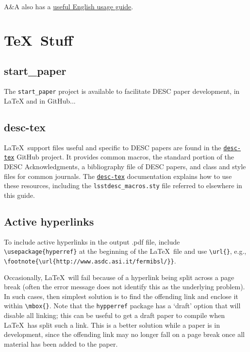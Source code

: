 \documentclass[letterpaper,11pt]{article}
\begin{document}
A\&A also has a \href{http://www.aanda.org/doc_journal/instructions/aa_english_guide.pdf}{useful English usage guide}. 

\section{\TeX\ Stuff}

\subsection{start\_paper}

The {\tt start\_paper} project is available to facilitate DESC paper development, in LaTeX and in GitHub...

\subsection{desc-tex}

La\TeX\ support files useful and specific to DESC papers are found in
the \href{https://github.com/LSSTDESC/desc-tex}{\tt desc-tex} GitHub project.
It provides common macros, the standard portion of the DESC Acknowledgments, a bibliography file of DESC papers, and class and style files for common journals.
The \href{https://github.com/LSSTDESC/desc-tex}{\tt desc-tex} documentation explains how to use these resources, including the {\tt lsstdesc\_macros.sty} file referred to elsewhere in this guide.

\subsection{Active hyperlinks}

To include active hyperlinks in the output .pdf file, include 
\verb|\usepackage{hyperref}| at the beginning of the La\TeX\ file and use
\verb|\url{}|, e.g., \verb|\footnote{\url{http://www.asdc.asi.it/fermibsl/}}|.

Occasionally, La\TeX\ will fail because of a hyperlink being split across
a page break (often the error message does not identify this as the underlying problem). In such cases, then simplest solution is to find the
offending link and enclose it within \verb|\mbox{}|. Note that the {\tt hypperref} package has a `draft' option that will disable all linking; this can be useful to get a draft paper to compile when La\TeX\ has split such a link. This is a better solution while a paper is in development, since the offending link may no longer fall on a page break once all material has been added to the paper.
\end{document}

